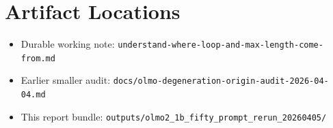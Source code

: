 \documentclass[11pt]{article}
\begin{document}
\section*{Artifact Locations}
\begin{itemize}[leftmargin=1.5em]
\item Durable working note: \texttt{understand-where-loop-and-max-length-come-from.md}
\item Earlier smaller audit: \texttt{docs/olmo-degeneration-origin-audit-2026-04-04.md}
\item This report bundle: \texttt{outputs/olmo2\_1b\_fifty\_prompt\_rerun\_20260405/}
\end{itemize}
\end{document}
